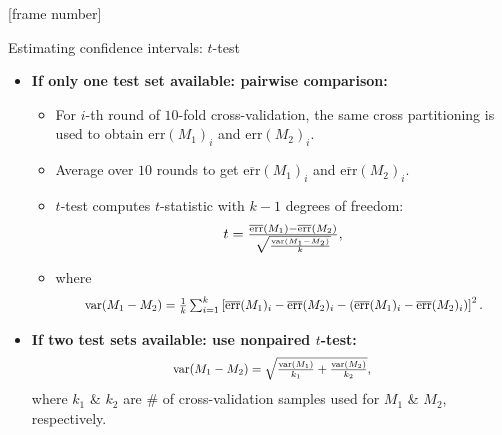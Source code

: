 \documentclass[aspectratio=169,t,table]{beamer}
\begin{document}
  {
    [frame number]
    \begin{frame}{Estimating confidence intervals: $t$-test}
      \begin{itemize}
        \item \textbf{If only one test set available: pairwise comparison:}
        \begin{itemize}
          \item For $i$-th round of $10$-fold cross-validation, the same cross partitioning is used to obtain $\text{err}(M_1)_i$ and $\text{err}(M_2)_i$.
          \item Average over $10$ rounds to get $\overline{\text{err}}(M_1)_i$ and $\overline{\text{err}}(M_2)_i$.
          \item $t$-test computes $t$-statistic with $k-1$ degrees of freedom:
                \begin{align}
                  \resizebox{3cm}{!}{%
                  $t = \frac{\overline{\text{err}}(M_1)- \overline{\text{err}}(M_2)}{\sqrt{\frac{\text{var}(M_1-M_2)}{k}}},$}
                \end{align}
          \item where
                \begin{align}
                  \resizebox{10cm}{!}{%
                  $\text{var}(M_1-M_2) = \frac{1}{k} \sum_{i=1}^{k} \left[ \overline{\text{err}}(M_1)_i - \overline{\text{err}}(M_2)_i - (\overline{\text{err}}(M_1)_i - \overline{\text{err}}(M_2)_i)\right]^2.$}
                \end{align}
        \end{itemize}
        \item \textbf{If two test sets available: use nonpaired $t$-test:}
              \begin{align}
                \resizebox{5cm}{!}{%
                $\text{var}(M_1-M_2) = \sqrt{\frac{\text{var}(M_1)}{k_1} + \frac{\text{var}(M_2)}{k_2}},$}
              \end{align}
              where $k_1$ \& $k_2$ are $\#$ of cross-validation samples used for $M_1$ \& $M_2$, respectively.
      \end{itemize}
    \end{frame}
  }
\end{document}
